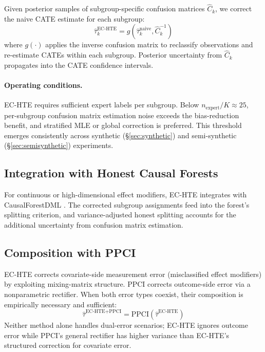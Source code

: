 \documentclass[11pt,a4paper]{article}
\begin{document}
Given posterior samples of subgroup-specific confusion matrices $\hat{C}_k$, we correct the naive CATE estimate for each subgroup:
\begin{equation}
\hat{\tau}_k^{\text{EC-HTE}} = g(\hat{\tau}_k^{\text{naive}}, \hat{C}_k^{-1})
\end{equation}
where $g(\cdot)$ applies the inverse confusion matrix to reclassify observations and re-estimate CATEs within each subgroup.
Posterior uncertainty from $\hat{C}_k$ propagates into the CATE confidence intervals.

\paragraph{Operating conditions.}
EC-HTE requires sufficient expert labels per subgroup.
Below $n_{\text{expert}}/K \approx 25$, per-subgroup confusion matrix estimation noise exceeds the bias-reduction benefit, and stratified MLE or global correction is preferred.
This threshold emerges consistently across synthetic (\S\ref{sec:synthetic}) and semi-synthetic (\S\ref{sec:semisynthetic}) experiments.

\subsection{Integration with Honest Causal Forests}

For continuous or high-dimensional effect modifiers, EC-HTE integrates with CausalForestDML \citep{athey2019generalized,chernozhukov2018double}.
The corrected subgroup assignments feed into the forest's splitting criterion, and variance-adjusted honest splitting accounts for the additional uncertainty from confusion matrix estimation.

\subsection{Composition with PPCI}\label{sec:ppci}

EC-HTE corrects covariate-side measurement error (misclassified effect modifiers) by exploiting mixing-matrix structure.
PPCI \citep{sui2026prediction} corrects outcome-side error via a nonparametric rectifier.
When both error types coexist, their composition is empirically necessary and sufficient:
\begin{equation}
\hat{\tau}^{\text{EC-HTE+PPCI}} = \text{PPCI}\left(\hat{\tau}^{\text{EC-HTE}}\right)
\end{equation}
Neither method alone handles dual-error scenarios; EC-HTE ignores outcome error while PPCI's general rectifier has higher variance than EC-HTE's structured correction for covariate error.
\end{document}
